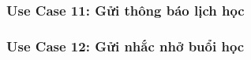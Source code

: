 \newpage
\subsubsection*{Use Case 11: Gửi thông báo lịch học}
\begin{samepage}

\end{samepage}


\newpage
\subsubsection*{Use Case 12: Gửi nhắc nhở buổi học}
\begin{samepage}

\end{samepage}



